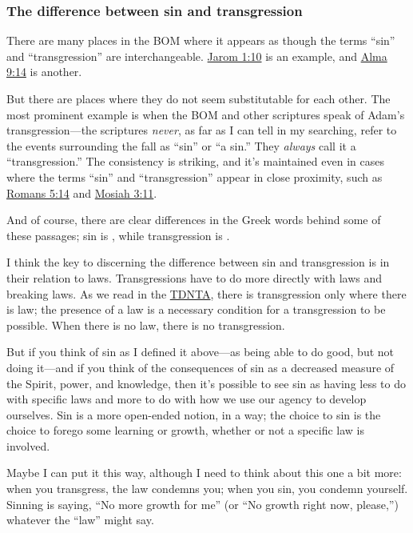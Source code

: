 		
		
		
		
		
	\subsubsection{The difference between sin and transgression}
		\label{SIN-sin-transgression}
		
		There are many places in the BOM where it appears as though the terms ``sin'' and ``transgression'' are interchangeable. \hyperref[JAROM-1-10]{Jarom 1:10} is an example, and \hyperref[ALMA-9-14]{Alma 9:14} is another.
		
		But there are places where they do not seem substitutable for each other. The most prominent example is when the BOM and other scriptures speak of Adam's transgression---the scriptures \textit{never}, as far as I can tell in my searching, refer to the events surrounding the fall as ``sin'' or ``a sin.'' They \textit{always} call it a ``transgression.'' The consistency is striking, and it's maintained even in cases where the terms ``sin'' and ``transgression'' appear in close proximity, such as \hyperref[ROMANS-5-14]{Romans 5:14} and \hyperref[MOSIAH-3-11]{Mosiah 3:11}.
		
		And of course, there are clear differences in the Greek words behind some of these passages; sin is \hyperref[HAMARTIA]{}, while transgression is \hyperref[PARABASIS]{}.
		
		I think the key to discerning the difference between sin and transgression is in their relation to laws. Transgressions have to do more directly with laws and breaking laws. As we read in the \hyperref[TRANSGRESSION-BD-TDNTA]{TDNTA}, there is transgression only where there is law; the presence of a law is a necessary condition for a transgression to be possible. When there is no law, there is no transgression.
		
		But if you think of sin as I defined it above---as being able to do good, but not doing it---and if you think of the consequences of sin as a decreased measure of the Spirit, power, and knowledge, then it's possible to see sin as having less to do with specific laws and more to do with how we use our agency to develop ourselves. Sin is a more open-ended notion, in a way; the choice to sin is the choice to forego some learning or growth, whether or not a specific law is involved. 
		
		Maybe I can put it this way, although I need to think about this one a bit more: when you transgress, the law condemns you; when you sin, you condemn yourself. Sinning is saying, ``No more growth for me'' (or ``No growth right now, please,'') whatever the ``law'' might say.
		
